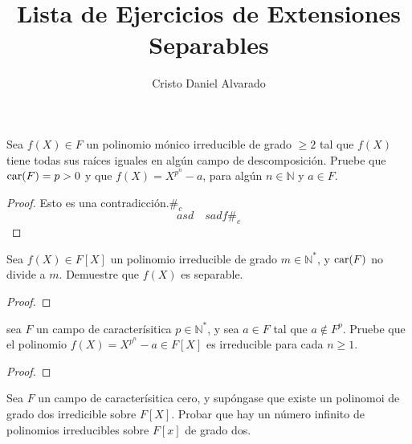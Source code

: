 \documentclass[12pt]{report}
\theoremstyle{largebreak}
\newcommand\contradiction{\ensuremath{\#_c}}
\newcommand{\car}[1]{\ensuremath{\textup{car}(#1)}}
\begin{document}
    \setlength{\parskip}{5pt} %
    \setlength{\parindent}{12pt} %
    \title{Lista de Ejercicios de Extensiones Separables}
    \author{Cristo Daniel Alvarado}
    \maketitle

    
    \setcounter{chapter}{3}
    \setcounter{section}{1}

    \begin{excer}
        Sea $f(X)\in F$ un polinomio mónico irreducible de grado $\geq2$ tal que $f(X)$ tiene todas sus raíces iguales en algún campo de descomposición. Pruebe que $\car{F}=p>0$ y que $f(X)=X^{p^n}-a$, para algún $n\in\mathbb{N}$ y $a\in F$.
    \end{excer}
    
    \begin{proof}
        Esto es una contradicción.\contradiction
        \begin{equation}
            asd\quad sadf\contradiction
        \end{equation}
    \end{proof}

    \begin{excer}
        Sea $f(X)\in F[X]$ un polinomio irreducible de grado $m\in\mathbb{N}^*$, y $\car{F}$ no divide a $m$. Demuestre que $f(X)$ es separable.
    \end{excer}

    \begin{proof}
        
    \end{proof}

    \begin{excer}
        sea $F$ un campo de caracterísitica $p\in\mathbb{N}^*$, y sea $a\in F$ tal que $a\notin F^p$. Pruebe que el polinomio $f(X)=X^{p^n}-a\in F[X]$ es irreducible para cada $n\geq 1$.
    \end{excer}

    \begin{proof}
        
    \end{proof}

    \begin{excer}
        Sea $F$ un campo de caracterísitica cero, y supóngase que existe un polinomoi de grado dos irredicible sobre $F[X]$. Probar que hay un número infinito de polinomios irreducibles sobre $F[x]$ de grado dos.
    \end{excer}
\end{document}
